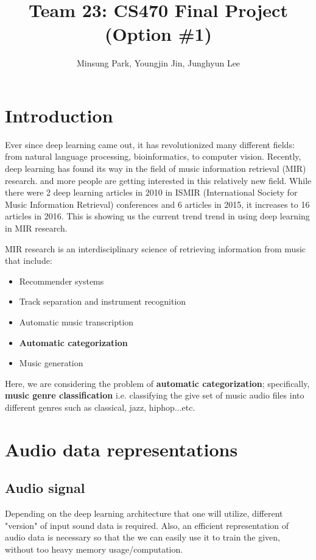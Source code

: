 \documentclass{article}
\title{Team 23: CS470 Final Project (Option \#1)}
\author{Minsung Park, Youngjin Jin, Junghyun Lee}
\theoremstyle{plain}
\theoremstyle{definition}
\theoremstyle{remark}
\begin{document}
\maketitle

\section{Introduction}

	Ever since deep learning came out, it has revolutionized many different fields: from natural language processing, bioinformatics, to computer vision.
	Recently, deep learning has found its way in the field of music information retrieval (MIR) research. and more people are getting interested in this relatively new field.
	While there were 2 deep learning articles in 2010 in ISMIR (International Society for Music Information Retrieval) conferences and 6 articles in 2015, it increases to 16 articles in 2016. This is showing us the current trend trend in using deep learning in MIR research.
	
	MIR research is an interdisciplinary science of retrieving information from music that include:
\begin{itemize}
	\item Recommender systems
	\item Track separation and instrument recognition
	\item Automatic music transcription
	\item {\bf Automatic categorization}
	\item Music generation
\end{itemize}	
	Here, we are considering the problem of {\bf automatic categorization}; specifically, {\bf music genre classification} i.e. classifying the give set of music audio files into different genres such as classical, jazz, hiphop...etc.
	

\section{Audio data representations}

\subsection{Audio signal}
	Depending on the deep learning architecture that one will utilize, different "version" of input sound data is required.
	Also, an efficient representation of audio data is necessary so that the we can easily use it  to train the given, without too heavy memory usage/computation.
	
\end{document}
